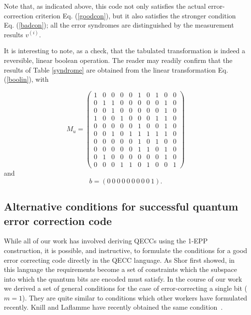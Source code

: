 Note that, as indicated above, this code not only satisfies the actual
error-correction criterion Eq. (\ref{goodcon}), but it also satisfies
the stronger condition Eq. (\ref{badcon}); all the error syndromes
are distinguished by the measurement results $v^{(i)}$.
 
It is interesting to note, as a check, that the tabulated transformation
is indeed a reversible, linear boolean operation.  The reader may
readily confirm that the results of Table \ref{syndrome} are obtained
from the linear transformation Eq. (\ref{boolin}), with
 
\begin{equation}
M_u=\left(\begin{array}{llllllllll}
1&0&0&0&0&1&0&1&0&0\\
0&1&1&0&0&0&0&0&1&0\\
0&0&1&0&0&0&0&0&1&0\\
1&0&0&1&0&0&0&1&1&0\\
0&0&0&0&0&1&0&0&1&0\\
0&0&1&0&1&1&1&1&1&0\\
0&0&0&0&0&1&0&1&0&0\\
0&0&0&0&0&1&1&0&1&0\\
0&1&0&0&0&0&0&0&1&0\\
0&0&0&1&1&0&1&0&0&1\end{array}
\right)
\end{equation}
and
\begin{equation}
b=(0\ 0\ 0\ 0\ 0\ 0\ 0\ 0\ 0\ 1).
\end{equation}

\subsection{Alternative conditions for successful quantum error correction code}
\label{subsec:linal}
 
While all of our work has involved deriving QECCs using the 1-EPP
construction, it is possible, and instructive, to formulate the
conditions for a good error correcting code directly in the QECC
language.  As Shor first showed\cite{shellgame}, in this language the
requirements become a set of constraints which the subspace into which
the quantum bits are encoded must satisfy.  In the course of our work
we derived a set of general conditions for the case of
error-correcting a single bit ($m=1$).  They are quite similar to
conditions which other workers have formulated recently\cite{EM,MZ}.
Knill and Laflamme have recently obtained the same 
condition~\cite{lafknill}.
 
